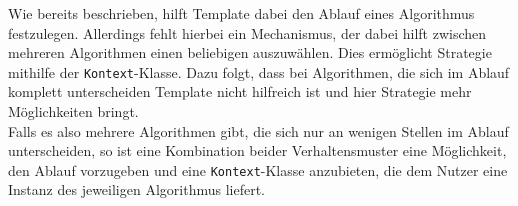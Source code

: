 Wie bereits beschrieben, hilft Template dabei den Ablauf eines Algorithmus festzulegen. Allerdings fehlt hierbei ein Mechanismus, der dabei hilft zwischen mehreren Algorithmen einen beliebigen auszuwählen. Dies ermöglicht Strategie mithilfe der \texttt{Kontext}-Klasse. Dazu folgt, dass bei Algorithmen, die sich im Ablauf komplett unterscheiden Template nicht hilfreich ist und hier Strategie mehr Möglichkeiten bringt.\\
Falls es also mehrere Algorithmen gibt, die sich nur an wenigen Stellen im Ablauf unterscheiden, so ist eine Kombination beider Verhaltensmuster eine Möglichkeit, den Ablauf vorzugeben und eine \texttt{Kontext}-Klasse anzubieten, die dem Nutzer eine Instanz des jeweiligen Algorithmus liefert.